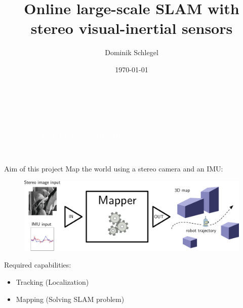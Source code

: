 \documentclass[11pt]{beamer}
\title{Online large-scale SLAM with stereo visual-inertial sensors}
\author{Dominik Schlegel}
\date{\today}
\begin{document}
{
\begin{frame}
\vspace{-70pt}
\center{\Huge{\textcolor{white}{\inserttitle}}}\\
\vspace{20pt}
\begin{minipage}{1.07\textwidth}
\textcolor{white}{\hfill\small{\insertauthor}}\\
\textcolor{white}{\hfill\small{Supervisor: Prof. Dr. Giorgio Grisetti}}
\end{minipage}
\vspace{10pt}\\
\hspace{-28pt}\textcolor{white}{\small{\insertdate}}
\end{frame}
}

\setcounter{framenumber}{0}

\begin{frame}{Aim of this project}
Map the world using a stereo camera and an IMU:
\begin{figure}[!htb]
\centering
\includegraphics[width=\textwidth]{figures/introduction/basic_concept.pdf}
\end{figure}
Required capabilities:
\begin{itemize}
\item Tracking  (Localization)
\item Mapping (Solving SLAM problem)
\end{itemize}
\end{frame}
\end{document}
